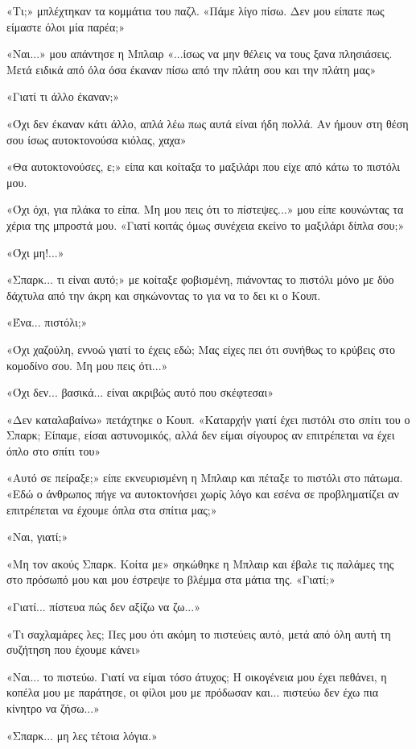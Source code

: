 \documentclass[12pt,twoside, openany]{book}
\begin{document}
«Τι;» μπλέχτηκαν τα κομμάτια του παζλ. «Πάμε λίγο πίσω. Δεν μου είπατε πως είμαστε όλοι μία παρέα;»

«Ναι...» μου απάντησε η Μπλαιρ «...ίσως να μην θέλεις να τους ξανα πλησιάσεις. Μετά ειδικά από όλα όσα έκαναν πίσω από την πλάτη σου και την πλάτη μας»

«Γιατί τι άλλο έκαναν;»

«Όχι δεν έκαναν κάτι άλλο, απλά λέω πως αυτά είναι ήδη πολλά. Αν ήμουν στη θέση σου ίσως αυτοκτονούσα κιόλας, χαχα»

«Θα αυτοκτονούσες, ε;» είπα και κοίταξα το μαξιλάρι που είχε από κάτω το πιστόλι μου.

«Όχι όχι, για πλάκα το είπα. Μη μου πεις ότι το πίστεψες...» μου είπε κουνώντας τα χέρια της μπροστά μου. «Γιατί κοιτάς όμως συνέχεια εκείνο το μαξιλάρι δίπλα σου;»

«Όχι μη!...»

«Σπαρκ... τι είναι αυτό;» με κοίταξε φοβισμένη, πιάνοντας το πιστόλι μόνο με δύο δάχτυλα από την άκρη και σηκώνοντας το για να το δει κι ο Κουπ.

«Ένα... πιστόλι;» 

«Όχι χαζούλη, εννοώ γιατί το έχεις εδώ; Μας είχες πει ότι συνήθως το κρύβεις στο κομοδίνο σου. Μη μου πεις ότι...»

«Όχι δεν... βασικά... είναι ακριβώς αυτό που σκέφτεσαι»

«Δεν καταλαβαίνω» πετάχτηκε ο Κουπ. «Καταρχήν γιατί έχει πιστόλι στο σπίτι του ο Σπαρκ; Είπαμε, είσαι αστυνομικός, αλλά δεν είμαι σίγουρος αν επιτρέπεται να έχει όπλο στο σπίτι του»

«Αυτό σε πείραξε;» είπε εκνευρισμένη η Μπλαιρ και πέταξε το πιστόλι στο πάτωμα. «Εδώ ο άνθρωπος πήγε να αυτοκτονήσει χωρίς λόγο και εσένα σε προβληματίζει αν επιτρέπεται να έχουμε όπλα στα σπίτια μας;»

«Ναι, γιατί;»

«Μη τον ακούς Σπαρκ. Κοίτα με» σηκώθηκε η Μπλαιρ και έβαλε τις παλάμες της στο πρόσωπό μου και μου έστρεψε το βλέμμα στα μάτια της. «Γιατί;»

«Γιατί... πίστευα πώς δεν αξίζω να ζω...»

«Τι σαχλαμάρες λες; Πες μου ότι ακόμη το πιστεύεις αυτό, μετά από όλη αυτή τη συζήτηση που έχουμε κάνει»

«Ναι... το πιστεύω. Γιατί να είμαι τόσο άτυχος; Η οικογένεια μου έχει πεθάνει, η κοπέλα μου με παράτησε, οι φίλοι μου με πρόδωσαν και... πιστεύω δεν έχω πια κίνητρο να ζήσω...»

«Σπαρκ... μη λες τέτοια λόγια.»
\end{document}
